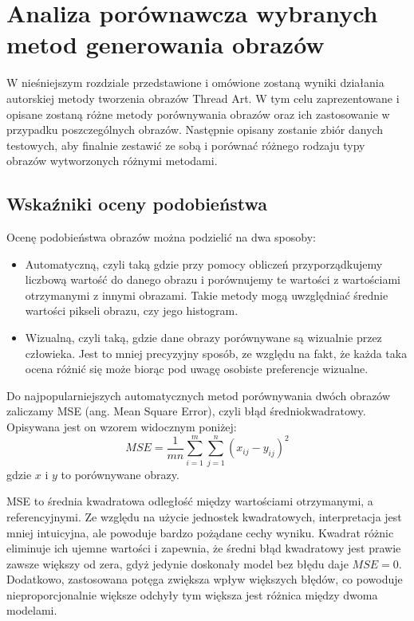 \documentclass[a4paper, 12pt, polish, twoside]{extreport}
\begin{document}
\chapter{Analiza porównawcza wybranych metod generowania obrazów} \label{comp}
W nieśniejszym rozdziale przedstawione i omówione zostaną wyniki działania autorskiej metody tworzenia obrazów Thread Art. W tym celu zaprezentowane i opisane zostaną różne metody porównywania obrazów oraz ich zastosowanie w przypadku poszczególnych obrazów. Następnie opisany zostanie zbiór danych testowych, aby finalnie zestawić ze sobą i porównać różnego rodzaju typy obrazów wytworzonych różnymi metodami.
    \section{Wskaźniki oceny podobieństwa} \label{comp-methods}
    Ocenę podobieństwa obrazów można podzielić na dwa sposoby:
    \begin{itemize}
        \item Automatyczną, czyli taką gdzie przy pomocy obliczeń przyporządkujemy liczbową wartość do danego obrazu i porównujemy te wartości z wartościami otrzymanymi z innymi obrazami. Takie metody mogą uwzględniać średnie wartości pikseli obrazu, czy jego histogram.
        \item Wizualną, czyli taką, gdzie dane obrazy porównywane są wizualnie przez człowieka. Jest to mniej precyzyjny sposób, ze względu na fakt, że każda taka ocena różnić się może biorąc pod uwagę osobiste preferencje wizualne.
    \end{itemize}
    
    Do najpopularniejszych automatycznych metod porównywania dwóch obrazów zaliczamy MSE (ang. Mean Square Error), czyli błąd średniokwadratowy. Opisywana jest on wzorem widocznym poniżej:
    \begin{equation} \label{comp-methods-mse}
        MSE=\frac{1}{mn} \sum_{i=1}^m \sum_{j=1}^n (x_{ij}-y_{ij})^2
    \end{equation}
    gdzie \(x\) i \(y\) to porównywane obrazy.
    
    MSE to średnia kwadratowa odległość między wartościami otrzymanymi, a referencyjnymi. Ze względu na użycie jednostek kwadratowych, interpretacja jest mniej intuicyjna, ale powoduje bardzo pożądane cechy wyniku. Kwadrat różnic eliminuje ich ujemne wartości i zapewnia, że średni błąd kwadratowy jest prawie zawsze większy od zera, gdyż jedynie doskonały model bez błędu daje \(MSE = 0\). Dodatkowo, zastosowana potęga zwiększa wpływ większych błędów, co powoduje nieproporcjonalnie większe odchyły tym większa jest różnica między dwoma modelami. 
    
\end{document}
